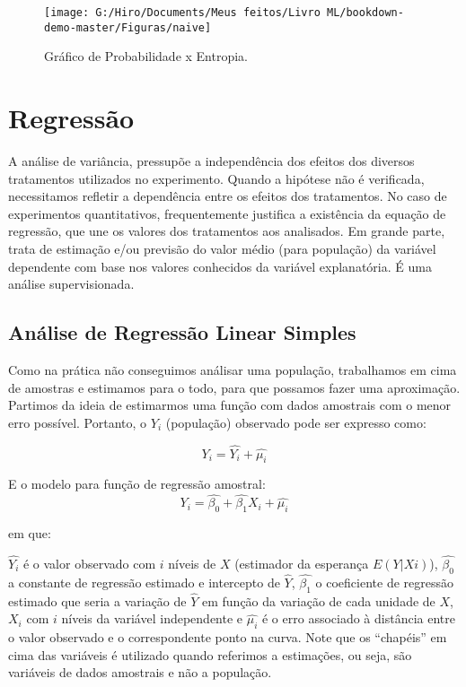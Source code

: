 \documentclass[
]{book}
\begin{document}
\begin{figure}

{\centering \texttt{[image: G:/Hiro/Documents/Meus feitos/Livro ML/bookdown-demo-master/Figuras/naive]} 

}

\caption{Gráfico de Probabilidade x Entropia.}\label{fig:naive}
\end{figure}



\hypertarget{reg}{%
\section{Regressão}\label{reg}}

A análise de variância, pressupõe a independência dos efeitos dos diversos tratamentos utilizados no experimento. Quando a hipótese não é verificada, necessitamos refletir a dependência entre os efeitos dos tratamentos. No caso de experimentos quantitativos, frequentemente justifica a existência da equação de regressão, que une os valores dos tratamentos aos analisados. Em grande parte, trata de estimação e/ou previsão do valor médio (para população) da variável dependente com base nos valores conhecidos da variável explanatória. É uma análise supervisionada.

\hypertarget{reglin}{%
\subsection{Análise de Regressão Linear Simples}\label{reglin}}

Como na prática não conseguimos análisar uma população, trabalhamos em cima de amostras e estimamos para o todo, para que possamos fazer uma aproximação. Partimos da ideia de estimarmos uma função com dados amostrais com o menor erro possível. Portanto, o \(Y_i\) (população) observado pode ser expresso como:

\begin{equation}
    Y_i=\hat{Y_i}+\hat{\mu_i}
    \label{eq:frp}
\end{equation}

E o modelo para função de regressão amostral:
\begin{equation}
    Y_i=\hat{\beta_0}+\hat{\beta_1}X_i+\hat{\mu_i}
    \label{eq:fra}
\end{equation}

em que:

\(\hat{Y_i}\) é o valor observado com \(i\) níveis de \(X\) (estimador da esperança \(E(Y|Xi)\)), \(\hat{\beta_0}\) a constante de regressão estimado e intercepto de \(\hat{Y}\), \(\hat{\beta_1}\) o coeficiente de regressão estimado que seria a variação de \(\hat{Y}\) em função da variação de cada unidade de \(X\), \(X_i\) com \(i\) níveis da variável independente e \(\hat{\mu_i}\) é o erro associado à distância entre o valor observado e o correspondente ponto na curva. Note que os ``chapéis'' em cima das variáveis é utilizado quando referimos a estimações, ou seja, são variáveis de dados amostrais e não a população.
\end{document}
